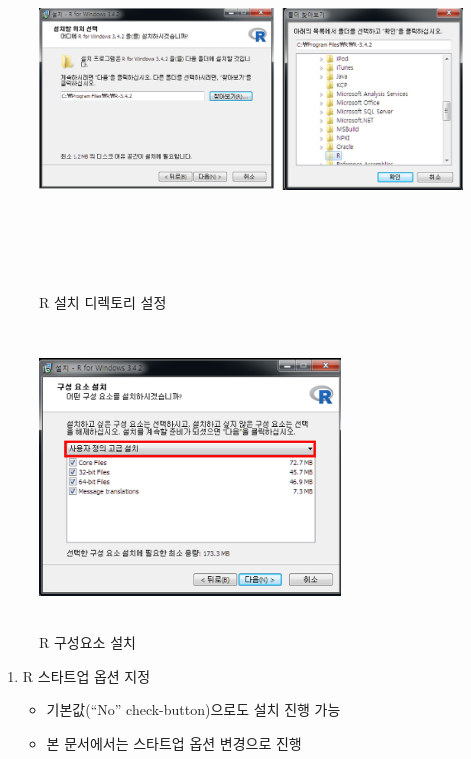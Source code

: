 \documentclass[11pt,a4paper]{book}
\providecommand{\tightlist}{%
  \setlength{\itemsep}{0pt}\setlength{\parskip}{0pt}}
\theoremstyle{definition}
\theoremstyle{definition}
\theoremstyle{definition}
\theoremstyle{remark}
\begin{document}
\begin{figure}[H]
{
  \centering
  \includegraphics[width = 15cm, height = 10cm]{Figures/R-install-F03.png}
  \caption[R 설치 디렉토리 설정]{R 설치 디렉토리 설정}\label{fig:R-install-08}
}
\end{figure}

\begin{figure}[H]
{
  \centering
  \includegraphics[width = 8cm, height = 8cm]{Figures/R-install-F04.png}
  \caption[R 구성요소 설치]{R 구성요소 설치}\label{fig:R-install-09}
}
\end{figure}

\begin{enumerate}
\def\labelenumi{\arabic{enumi}.}
\setcounter{enumi}{10}
\tightlist
\item
  R 스타트업 옵션 지정

  \begin{itemize}
  \tightlist
  \item
    기본값(``No'' check-button)으로도 설치 진행 가능
  \item
    본 문서에서는 스타트업 옵션 변경으로 진행
  \end{itemize}
\end{enumerate}
\end{document}
